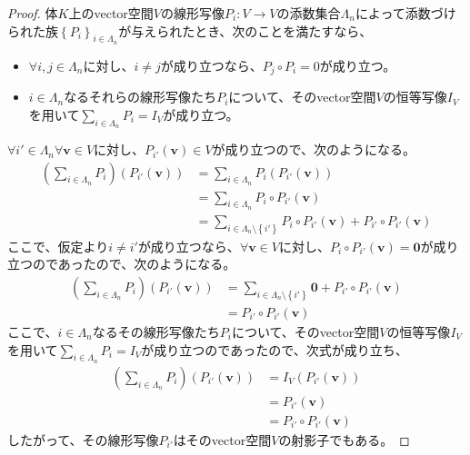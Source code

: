 \documentclass[dvipdfmx]{jsarticle}
\begin{document}
\begin{proof}
体$K$上のvector空間$V$の線形写像$P_{i}:V \rightarrow V$の添数集合$\varLambda_{n}$によって添数づけられた族$\left\{ P_{i} \right\}_{i \in \varLambda_{n}}$が与えられたとき、次のことを満たすなら、
\begin{itemize}
\item
  $\forall i,j \in \varLambda_{n}$に対し、$i \neq j$が成り立つなら、$P_{j} \circ P_{i} = 0$が成り立つ。
\item
  $i \in \varLambda_{n}$なるそれらの線形写像たち$P_{i}$について、そのvector空間$V$の恒等写像$I_{V}$を用いて$\sum_{i \in \varLambda_{n}} P_{i} = I_{V}$が成り立つ。
\end{itemize}
$\forall i' \in \varLambda_{n}\forall\mathbf{v} \in V$に対し、$P_{i'}\left( \mathbf{v} \right) \in V$が成り立つので、次のようになる。
\begin{align*}
\left( \sum_{i \in \varLambda_{n}} P_{i} \right)\left( P_{i'}\left( \mathbf{v} \right) \right) &= \sum_{i \in \varLambda_{n}} {P_{i}\left( P_{i'}\left( \mathbf{v} \right) \right)}\\
&= \sum_{i \in \varLambda_{n}} {P_{i} \circ P_{i'}\left( \mathbf{v} \right)}\\
&= \sum_{i \in \varLambda_{n} \setminus \left\{ i' \right\}} {P_{i} \circ P_{i'}\left( \mathbf{v} \right)} + P_{i'} \circ P_{i'}\left( \mathbf{v} \right)
\end{align*}
ここで、仮定より$i \neq i'$が成り立つなら、$\forall\mathbf{v} \in V$に対し、$P_{i} \circ P_{i'}\left( \mathbf{v} \right) = \mathbf{0}$が成り立つのであったので、次のようになる。
\begin{align*}
\left( \sum_{i \in \varLambda_{n}} P_{i} \right)\left( P_{i'}\left( \mathbf{v} \right) \right) &= \sum_{i \in \varLambda_{n} \setminus \left\{ i' \right\}} \mathbf{0} + P_{i'} \circ P_{i'}\left( \mathbf{v} \right)\\
&= P_{i'} \circ P_{i'}\left( \mathbf{v} \right)
\end{align*}
ここで、$i \in \varLambda_{n}$なるその線形写像たち$P_{i}$について、そのvector空間$V$の恒等写像$I_{V}$を用いて$\sum_{i \in \varLambda_{n}} P_{i} = I_{V}$が成り立つのであったので、次式が成り立ち、
\begin{align*}
\left( \sum_{i \in \varLambda_{n}} P_{i} \right)\left( P_{i'}\left( \mathbf{v} \right) \right) &= I_{V}\left( P_{i'}\left( \mathbf{v} \right) \right)\\
&= P_{i'}\left( \mathbf{v} \right)\\
&= P_{i'} \circ P_{i'}\left( \mathbf{v} \right)
\end{align*}
したがって、その線形写像$P_{i'}$はそのvector空間$V$の射影子でもある。
\end{proof}
\end{document}
